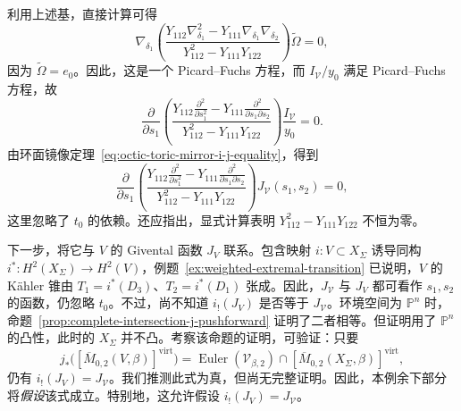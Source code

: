 \begin{example}
利用上述基，直接计算可得
\[
\nabla_{\delta_1}\left(\frac{Y_{112}\nabla_{\delta_1}^2-Y_{111}\nabla_{\delta_1}\nabla_{\delta_2}}{Y_{112}^2-Y_{111}Y_{122}}\right)\widetilde\Omega=0,
\]
因为 $\widetilde\Omega=e_0$。因此，这是一个 Picard--Fuchs 方程，而 $I_{\mathcal V}/y_0$ 满足 Picard--Fuchs 方程，故
\[
\frac\partial{\partial s_1}\left(\frac{Y_{112}\frac{\partial^2}{\partial s_1^2}-Y_{111}\frac{\partial^2}{\partial s_1\partial s_2}}{Y_{112}^2-Y_{111}Y_{122}}\right)\frac{I_{\mathcal V}}{y_0}=0.
\]
由环面镜像定理~\eqref{eq:octic-toric-mirror-i-j-equality}，得到
\begin{equation}\label{eq:octic-toric-j-yukawa-differential-equation}
\frac\partial{\partial s_1}\left(\frac{Y_{112}\frac{\partial^2}{\partial s_1^2}-Y_{111}\frac{\partial^2}{\partial s_1\partial s_2}}{Y_{112}^2-Y_{111}Y_{122}}\right)J_{\mathcal V}(s_1,s_2)=0,
\end{equation}
这里忽略了 $t_0$ 的依赖。还应指出，显式计算表明 $Y_{112}^2-Y_{111}Y_{122}$ 不恒为零。

下一步，将它与 $V$ 的 Givental 函数 $J_V$ 联系。包含映射 $i:V\subset X_\Sigma$ 诱导同构 $i^*:H^2(X_\Sigma)\to H^2(V)$，例题~\ref{ex:weighted-extremal-transition} 已说明，$V$ 的 Kähler 锥由 $T_1=i^*(D_3)$、$T_2=i^*(D_1)$ 张成。因此，$J_{\mathcal V}$ 与 $J_V$ 都可看作 $s_1,s_2$ 的函数，仍忽略 $t_0$。不过，尚不知道 $i_!(J_V)$ 是否等于 $J_{\mathcal V}$。环境空间为 $\mathbb P^n$ 时，命题~\ref{prop:complete-intersection-j-pushforward} 证明了二者相等。但证明用了 $\mathbb P^n$ 的凸性，此时的 $X_\Sigma$ 并不凸。考察该命题的证明，可验证：只要
\begin{equation}\label{eq:octic-virtual-class-pushforward-assumption}
j_*\bigl([\overline M_{0,2}(V,\beta)]^{\mathrm{virt}}\bigr)
=\operatorname{Euler}(\mathcal V_{\beta,2})\cap[\overline M_{0,2}(X_\Sigma,\beta)]^{\mathrm{virt}},
\end{equation}
仍有 $i_!(J_V)=J_{\mathcal V}$。我们推测此式为真，但尚无完整证明。因此，本例余下部分将\emph{假设}该式成立。特别地，这允许假设 $i_!(J_V)=J_{\mathcal V}$。


\end{example}
